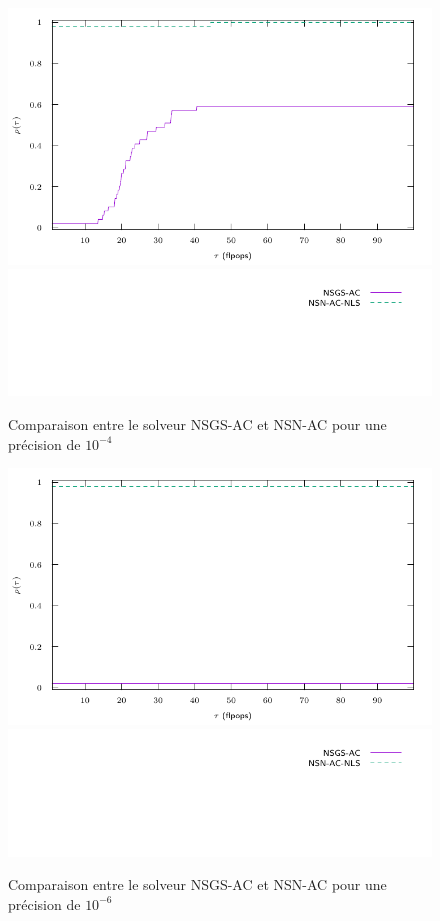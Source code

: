 \documentclass{CSMA2017}
\begin{document}
\begin{figure}
  \centering
  \includegraphics{figure/LowWall_FEM.1e-4/simple/profile-LMGC_LowWall_FEM.pdf}
  \includegraphics{figure/LowWall_FEM.1e-4/simple/profile-LMGC_LowWall_FEM_legend.pdf}
  \caption{Comparaison entre le solveur NSGS-AC et NSN-AC pour une précision de $10^{-4}$}
  \label{fig:LowWall_FEM.1e-4.simple}
\end{figure}
\begin{figure}
  \centering
  \includegraphics{figure/LowWall_FEM.1e-6/simple/profile-LMGC_LowWall_FEM.pdf}
  \includegraphics{figure/LowWall_FEM.1e-6/simple/profile-LMGC_LowWall_FEM_legend.pdf}
  \caption{Comparaison entre le solveur NSGS-AC et NSN-AC pour une précision de $10^{-6}$}
  \label{fig:LowWall_FEM.1e-6.simple}
\end{figure}
\end{document}
